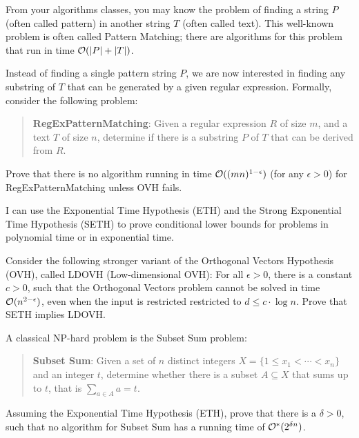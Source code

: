 \documentclass[english]{uebung_cs}
\begin{document}
\begin{exercise}
  From your algorithms classes, you may know the problem of finding a string \( P \) (often called pattern) in another string \( T \) (often called text). This well-known problem is often called Pattern Matching; there are algorithms for this problem that run in time \( \mathcal{O}(|P| + |T|) \).

  Instead of finding a single pattern string \( P \), we are now interested in finding any substring of \( T \) that can be generated by a given regular expression. Formally, consider the following problem:
  \begin{quote}
    \textbf{RegExPatternMatching}: Given a regular expression \( R \) of size \( m \), and a text \( T \) of size \( n \), determine if there is a substring \( P \) of \( T \) that can be derived from \( R \).
  \end{quote}
  Prove that there is no algorithm running in time \( \mathcal{O}((mn)^{1-\epsilon}) \) (for any \( \epsilon > 0 \)) for RegExPatternMatching unless OVH fails.
\end{exercise}

\newpage

\begin{skill}[ETH][\mandatory]
  I can use the Exponential Time Hypothesis (ETH) and the Strong Exponential Time Hypothesis (SETH) to prove conditional lower bounds for problems in polynomial time or in exponential time.
\end{skill}

\begin{exercise}
  Consider the following stronger variant of the Orthogonal Vectors Hypothesis (OVH), called LDOVH (Low-dimensional OVH): For all \(\epsilon > 0\), there is a constant \(c > 0\), such that the Orthogonal Vectors problem cannot be solved in time \(\mathcal{O}(n^{2-\epsilon})\), even when the input is restricted restricted to \(d \leq c \cdot \log n\).
  Prove that SETH implies LDOVH.
\end{exercise}

\begin{exercise}
  A classical NP-hard problem is the Subset Sum problem:
  \begin{quote}
    \textbf{Subset Sum}: Given a set of \(n\) distinct integers \(X = \{1 \leq x_1 < \cdots < x_n\}\) and an integer \(t\), determine whether there is a subset \(A \subseteq X\) that sums up to \(t\), that is \(\sum_{a \in A} a = t\).
  \end{quote}
  Assuming the Exponential Time Hypothesis (ETH), prove that there is a \( \delta > 0 \), such that no algorithm for Subset Sum has a running time of \( \mathcal{O}^*(2^{\delta n}) \).
\end{exercise}
\end{document}
